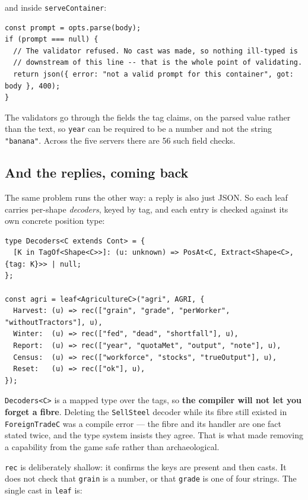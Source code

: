 \documentclass[11pt,a4paper]{article}
\begin{document}
\noindent and inside \texttt{serveContainer}:

\begin{lstlisting}
const prompt = opts.parse(body);
if (prompt === null) {
  // The validator refused. No cast was made, so nothing ill-typed is
  // downstream of this line -- that is the whole point of validating.
  return json({ error: "not a valid prompt for this container", got: body }, 400);
}
\end{lstlisting}

\noindent The validators go through the fields the tag claims, on the parsed
value rather than the text, so \texttt{year} can be required to be a number and
not the string \texttt{"banana"}. Across the five servers there are 56 such
field checks.

\subsection{And the replies, coming back}

The same problem runs the other way: a reply is also just JSON. So each leaf
carries per-shape \emph{decoders}, keyed by tag, and each entry is checked
against its own concrete position type:

\begin{lstlisting}
type Decoders<C extends Cont> = {
  [K in TagOf<Shape<C>>]: (u: unknown) => PosAt<C, Extract<Shape<C>, {tag: K}>> | null;
};

const agri = leaf<AgricultureC>("agri", AGRI, {
  Harvest: (u) => rec(["grain", "grade", "perWorker", "withoutTractors"], u),
  Winter:  (u) => rec(["fed", "dead", "shortfall"], u),
  Report:  (u) => rec(["year", "quotaMet", "output", "note"], u),
  Census:  (u) => rec(["workforce", "stocks", "trueOutput"], u),
  Reset:   (u) => rec(["ok"], u),
});
\end{lstlisting}

\noindent \texttt{Decoders<C>} is a mapped type over the tags, so \textbf{the
compiler will not let you forget a fibre}. Deleting the \texttt{SellSteel}
decoder while its fibre still existed in \texttt{ForeignTradeC} was a compile
error --- the fibre and its handler are one fact stated twice, and the type
system insists they agree. That is what made removing a capability from the
game safe rather than archaeological.

\texttt{rec} is deliberately shallow: it confirms the keys are present and then
casts. It does not check that \texttt{grain} is a number, or that
\texttt{grade} is one of four strings. The single cast in \texttt{leaf} is:
\end{document}
